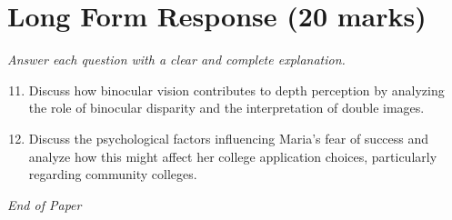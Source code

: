 \documentclass[12pt]{article}
\begin{document}
\section*{Long Form Response (20 marks)}
\textit{Answer each question with a clear and complete explanation.}
\begin{enumerate}[label=\arabic*.]
\setcounter{enumi}{10}
\item Discuss how binocular vision contributes to depth perception by analyzing the role of binocular disparity and the interpretation of double images.
\item Discuss the psychological factors influencing Maria's fear of success and analyze how this might affect her college application choices, particularly regarding community colleges.
\end{enumerate}

\vfill
\noindent\textit{End of Paper}
\end{document}
